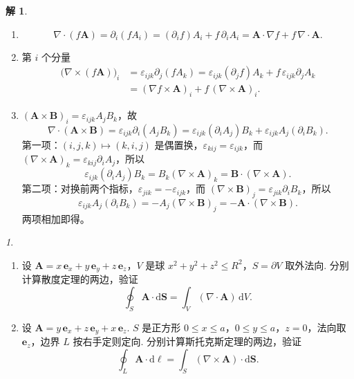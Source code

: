 \documentclass[11pt]{article}
\theoremstyle{remark}
\newtheorem{problem}{}
\theoremstyle{definition}
\newtheorem{solution}{解}
\begin{document}
\begin{solution}
\begin{enumerate}
  \item
    \[
      \nabla\cdot(f\mathbf{A})
      =\partial_i(f A_i)
      =(\partial_i f)A_i+f\,\partial_i A_i
      =\mathbf{A}\cdot\nabla f+f\,\nabla\cdot\mathbf{A}.
    \]
  \item 第 $i$ 个分量
    \begin{align*}
      \bigl(\nabla\times(f\mathbf{A})\bigr)_i
      &=\varepsilon_{ijk}\partial_j(f A_k)
       =\varepsilon_{ijk}(\partial_j f)A_k
        +f\,\varepsilon_{ijk}\partial_j A_k \\
      &=(\nabla f\times\mathbf{A})_i
        +f\,(\nabla\times\mathbf{A})_i.
    \end{align*}
  \item $(\mathbf{A}\times\mathbf{B})_i=\varepsilon_{ijk}A_j B_k$，故
    \[
      \nabla\cdot(\mathbf{A}\times\mathbf{B})
      =\varepsilon_{ijk}\partial_i(A_j B_k)
      =\varepsilon_{ijk}(\partial_i A_j)B_k
       +\varepsilon_{ijk}A_j(\partial_i B_k).
    \]
    第一项：$(i,j,k)\mapsto(k,i,j)$ 是偶置换，$\varepsilon_{kij}=\varepsilon_{ijk}$，而
    $(\nabla\times\mathbf{A})_k=\varepsilon_{kij}\partial_i A_j$，所以
    \[
      \varepsilon_{ijk}(\partial_i A_j)B_k
      =B_k(\nabla\times\mathbf{A})_k
      =\mathbf{B}\cdot(\nabla\times\mathbf{A}).
    \]
    第二项：对换前两个指标，$\varepsilon_{jik}=-\varepsilon_{ijk}$，而
    $(\nabla\times\mathbf{B})_j=\varepsilon_{jik}\partial_i B_k$，所以
    \[
      \varepsilon_{ijk}A_j(\partial_i B_k)
      =-A_j(\nabla\times\mathbf{B})_j
      =-\mathbf{A}\cdot(\nabla\times\mathbf{B}).
    \]
    两项相加即得。
\end{enumerate}
\end{solution}

\begin{problem}
  \begin{enumerate}
    \item 设 $\mathbf{A}=x\,\mathbf{e}_x+y\,\mathbf{e}_y+z\,\mathbf{e}_z$，$V$ 是球 $x^2+y^2+z^2\le R^2$，$S=\partial V$ 取外法向. 分别计算散度定理的两边，验证
      \[
        \oint_S\mathbf{A}\cdot\mathrm{d}\mathbf{S}
        =\int_V(\nabla\cdot\mathbf{A})\,\mathrm{d}V.
      \]
    \item 设 $\mathbf{A}=y\,\mathbf{e}_x+z\,\mathbf{e}_y+x\,\mathbf{e}_z$. $S$ 是正方形 $0\le x\le a$，$0\le y\le a$，$z=0$，法向取 $\mathbf{e}_z$，边界 $L$ 按右手定则定向. 分别计算斯托克斯定理的两边，验证
      \[
        \oint_L\mathbf{A}\cdot\mathrm{d}\boldsymbol{\ell}
        =\int_S(\nabla\times\mathbf{A})\cdot\mathrm{d}\mathbf{S}.
      \]
  \end{enumerate}
\end{problem}
\end{document}
